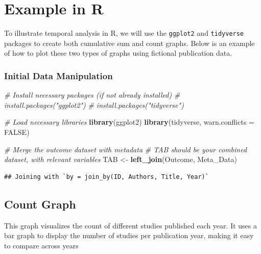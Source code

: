 \documentclass[
]{book}
\newenvironment{Shaded}{\begin{snugshade}}{\end{snugshade}}
\newcommand{\AttributeTok}[1]{\textcolor[rgb]{0.13,0.29,0.53}{#1}}
\newcommand{\CommentTok}[1]{\textcolor[rgb]{0.56,0.35,0.01}{\textit{#1}}}
\newcommand{\ConstantTok}[1]{\textcolor[rgb]{0.56,0.35,0.01}{#1}}
\newcommand{\FunctionTok}[1]{\textcolor[rgb]{0.13,0.29,0.53}{\textbf{#1}}}
\newcommand{\NormalTok}[1]{#1}
\newcommand{\OtherTok}[1]{\textcolor[rgb]{0.56,0.35,0.01}{#1}}
\begin{document}
\section{Example in R}\label{example-in-r}

To illustrate temporal analysis in R, we will use the \texttt{ggplot2} and \texttt{tidyverse} packages to create both cumulative sum and count graphs.
Below is an example of how to plot these two types of graphs using fictional publication data.

\subsubsection{Initial Data Manipulation}\label{initial-data-manipulation}

\begin{Shaded}
\begin{Highlighting}[]
\CommentTok{\# Install necessary packages (if not already installed)}
\CommentTok{\# install.packages("ggplot2")}
\CommentTok{\# install.packages("tidyverse")}

\CommentTok{\# Load necessary libraries}
\FunctionTok{library}\NormalTok{(ggplot2)}
\FunctionTok{library}\NormalTok{(tidyverse, }\AttributeTok{warn.conflicts =} \ConstantTok{FALSE}\NormalTok{)}

\CommentTok{\# Merge the outcome dataset with metadata}
\CommentTok{\# TAB should be your combined dataset, with relevant variables}
\NormalTok{TAB }\OtherTok{\textless{}{-}} \FunctionTok{left\_join}\NormalTok{(Outcome, Meta\_Data)}
\end{Highlighting}
\end{Shaded}

\begin{verbatim}
## Joining with `by = join_by(ID, Authors, Title, Year)`
\end{verbatim}

\subsection{Count Graph}\label{count-graph}

This graph visualizes the count of different studies published each year.
It uses a bar graph to display the number of studies per publication year, making it easy to compare across years
\end{document}

